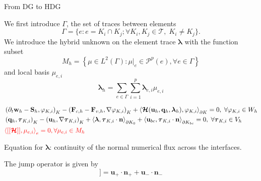\documentclass[24pt,t,table, aspectratio=169]{beamer}
\newcommand{\vecu}{\mathbf{u}}
\newcommand{\vecF}{\mathbf{F}}
\newcommand{\vecS}{\mathbf{S}}
\newcommand{\vecq}{\mathbf{q}}
\newcommand{\vecw}{\mathbf{w}}
\newcommand{\vectau}{\boldsymbol{\tau}}
\newcommand{\vecHcal}{\boldsymbol{\mathcal{H}}}
\newcommand{\veclambda}{\boldsymbol{\lambda}}
\newcommand{\tesselation}{\mathcal{T}}
\newcommand{\vecn}{\mathbf{n}}
\begin{document}
\begin{frame}{From DG to HDG}
{We first introduce $\Gamma$, the set of traces between elements
\begin{equation*}
    \Gamma = \{e:e = K_i \cap K_j; \forall K_i, K_j \in \tesselation,\; K_i \neq K_j\}.
\end{equation*}
We introduce the hybrid unknown on the element trace $\veclambda$ with the function subset
\begin{equation*}
M_h = \left\{\mu \in L^2(\Gamma) : \mu|_e \in \mathcal{P}^p(e), \forall e\in \Gamma\right\}
\end{equation*}
and local basis $\mu_{e,i}$
\begin{equation*}
\veclambda_h = \sum_{e\in\Gamma}\sum_{i=1}^{p} \veclambda_{e,i} \mu_{e,i}
\end{equation*}

}

{
\begin{equation*}
\begin{aligned}
& \left(\partial_t \vecw_{h} - \vecS_{h}, \varphi_{K,i} \right)_{K} - \left(\vecF_{c, {h}} - \vecF_{v, {h}}, \nabla \varphi_{K,i} \right)_{K} + \left\langle \vecHcal(\vecu_h, \vecq_h, \veclambda_h), \varphi_{K,i} \right\rangle_{\partial K} = 0, \; \forall \varphi_{K,i} \in W_h\\
& \left(\vecq_h, \vectau_{K,i}\right)_{K} - \left(\vecu_h, \nabla \vectau_{K,i}\right)_{K} + \left\langle \veclambda, \vectau_{K,i} \cdot \vecn \right\rangle_{\partial K_0} + \left\langle \vecu_{bc}, \vectau_{K,i} \cdot \vecn \right\rangle_{\partial K_{bc}} = 0,\; \forall \vectau_{K,i} \in V_h\\
& \textcolor{red}{\left\langle[[\vecHcal]], \mu_{e,i} \right\rangle_{e} = 0, \forall \mu_{e,i} \in M_h}
\end{aligned}
\end{equation*}

Equation for $\veclambda$: continuity of the normal numerical flux across the interfaces.

The jump operator is given by
\begin{equation*}
[[\vecu]] = \vecu_+ \cdot \vecn_+ + \vecu_- \cdot \vecn_-
\end{equation*}

}


\end{frame}
\end{document}
